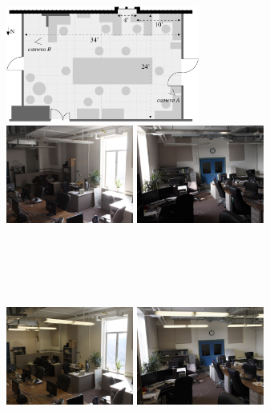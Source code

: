 \documentclass[review]{vgtc}                 %
\begin{document}
\begin{figure}[t]
\centering
\includegraphics[width=2.5in]{images/lab.pdf} \vspace{0.1in}
\\
\includegraphics[width=1.65in]{images/photos/camera_angle_2_lights_off.jpg}
\includegraphics[width=1.65in]{images/photos/camera_angle_3_lights_off.jpg}\vspace{-0.19in}\\
\begin{minipage}{1.65in}~{\color{white}{\em camera A, lights off}}\end{minipage}
\begin{minipage}{1.65in}~{\color{white}{\em camera B, lights off}}\end{minipage}\vspace{0.05in}\\
\includegraphics[width=1.65in]{images/photos/camera_angle_2_lights_on.jpg}
\includegraphics[width=1.65in]{images/photos/camera_angle_3_lights_on.jpg}\vspace{-0.19in}\\

\end{figure}
\end{document}
